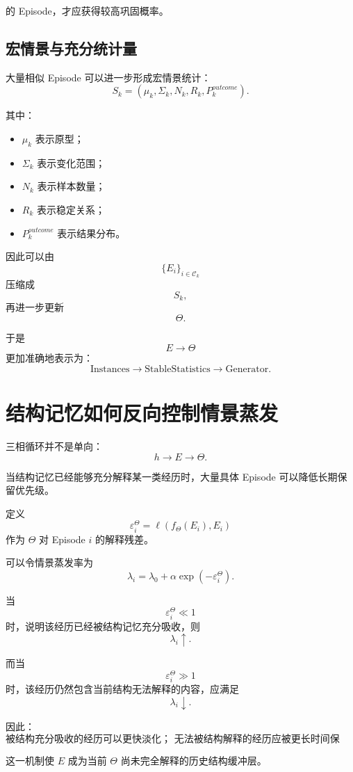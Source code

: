 的 Episode，才应获得较高巩固概率。

\subsection{宏情景与充分统计量}

大量相似 Episode 可以进一步形成宏情景统计：
\[
\boxed{
S_k
=
(
\mu_k,
\Sigma_k,
N_k,
R_k,
P_k^{outcome}
).
}
\]

其中：

\begin{itemize}
    \item $\mu_k$ 表示原型；
    \item $\Sigma_k$ 表示变化范围；
    \item $N_k$ 表示样本数量；
    \item $R_k$ 表示稳定关系；
    \item $P_k^{outcome}$ 表示结果分布。
\end{itemize}

因此可以由
\[
\{E_i\}_{i\in\mathcal C_k}
\]
压缩成
\[
S_k,
\]
再进一步更新
\[
\Theta.
\]

于是
\[
\boxed{
E\rightarrow\Theta
}
\]
更加准确地表示为：
\[
\boxed{
\mathrm{Instances}
\rightarrow
\mathrm{StableStatistics}
\rightarrow
\mathrm{Generator}.
}
\]

\section{结构记忆如何反向控制情景蒸发}

三相循环并不是单向：
\[
h\rightarrow E\rightarrow\Theta.
\]

当结构记忆已经能够充分解释某一类经历时，大量具体 Episode 可以降低长期保留优先级。

定义
\[
\varepsilon_i^\Theta
=
\ell
\left(
f_\Theta(E_i),
E_i
\right)
\]
作为 $\Theta$ 对 Episode $i$ 的解释残差。

可以令情景蒸发率为
\[
\boxed{
\lambda_i
=
\lambda_0
+
\alpha
\exp
\left(
-\varepsilon_i^\Theta
\right).
}
\]

当
\[
\varepsilon_i^\Theta\ll1
\]
时，说明该经历已经被结构记忆充分吸收，则
\[
\lambda_i\uparrow.
\]

而当
\[
\varepsilon_i^\Theta\gg1
\]
时，该经历仍然包含当前结构无法解释的内容，应满足
\[
\lambda_i\downarrow.
\]

因此：
\[
\boxed{
\text{被结构充分吸收的经历可以更快淡化；
无法被结构解释的经历应被更长时间保留。}
}
\]

这一机制使 $E$ 成为当前 $\Theta$ 尚未完全解释的历史结构缓冲层。

